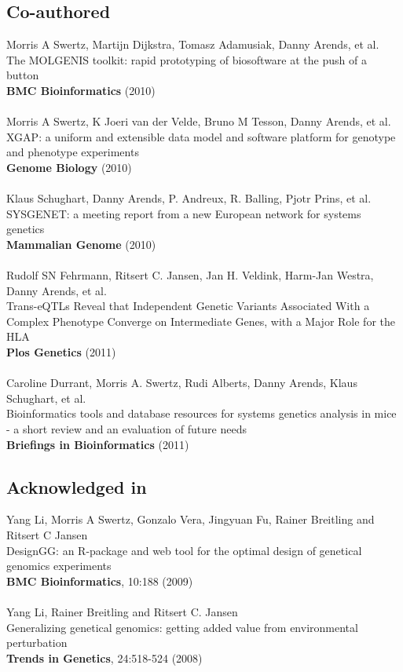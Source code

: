 \documentclass[11pt, twoside, a5paper]{report}
\newcommand{\authors}[1]{\small{#1}}
\newcommand{\bold}[1]{{\bfseries #1}}
\begin{document}
\subsection*{Co-authored}
  \authors{Morris A Swertz, Martijn Dijkstra, Tomasz Adamusiak, Danny Arends, et al.}\\
  The MOLGENIS toolkit: rapid prototyping of biosoftware at the push of a button\\
  \bold{BMC Bioinformatics} (2010)\\\\
  \authors{Morris A Swertz, K Joeri van der Velde, Bruno M Tesson, Danny Arends, et al.}\\
  XGAP: a uniform and extensible data model and software platform for genotype and phenotype experiments\\
  \bold{Genome Biology} (2010)\\\\
  \authors{Klaus Schughart, Danny Arends, P. Andreux, R. Balling, Pjotr Prins, et al.}\\
  SYSGENET: a meeting report from a new European network for systems genetics\\
  \bold{Mammalian Genome} (2010)\\\\
  \authors{Rudolf SN Fehrmann, Ritsert C. Jansen, Jan H. Veldink, Harm-Jan Westra, Danny Arends, et al.}\\
  Trans-eQTLs Reveal that Independent Genetic Variants Associated With a Complex Phenotype Converge on Intermediate Genes, with a Major Role for the HLA\\
  \bold{Plos Genetics} (2011)\\\\
  \authors{Caroline Durrant, Morris A. Swertz, Rudi Alberts, Danny Arends, Klaus Schughart, et al.}\\
  Bioinformatics tools and database resources for systems genetics analysis in mice - a short review and an evaluation of future needs\\
  \bold{Briefings in Bioinformatics} (2011)

\subsection*{Acknowledged in}
  \authors{Yang Li, Morris A Swertz, Gonzalo Vera, Jingyuan Fu, Rainer Breitling and Ritsert C Jansen}\\
  DesignGG: an R-package and web tool for the optimal design of genetical genomics experiments\\
  \bold{BMC Bioinformatics}, 10:188 (2009)\\\\
  \authors{Yang Li, Rainer Breitling and Ritsert C. Jansen}\\
  Generalizing genetical genomics: getting added value from environmental perturbation\\
  \bold{Trends in Genetics}, 24:518-524 (2008)



\end{document}
